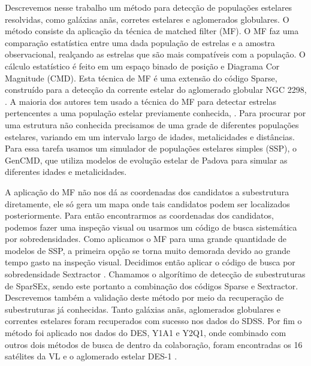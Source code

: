 \documentclass[
	12pt,				%
	openany,			%
	oneside,			%
	a4paper,			%
	english,			%
	brazil				%
	]{abntex2}
\begin{document}
Descrevemos nesse trabalho um método para detecção de populações estelares resolvidas, como galáxias anãs, corretes estelares e aglomerados globulares. O método consiste da aplicação da técnica de matched filter (MF). O MF faz uma comparação estatística entre uma dada população de estrelas e a amostra observacional,  realçando as estrelas que são mais compatíveis com a população. O cálculo estatístico é feito em um espaço binado de posição e Diagrama Cor Magnitude (CMD). Esta técnica de MF é uma extensão do código Sparse, construído para a detecção da corrente estelar do aglomerado globular NGC 2298, \cite{2011MNRAS.416..393B}.
A maioria dos autores tem usado a técnica do MF para detectar estrelas pertencentes a uma população estelar previamente conhecida, \cite{2012ASPC..458..219G,2009AAS...21344217D}. Para procurar por uma estrutura não conhecida precisamos de uma grade de diferentes populações estelares, variando em um intervalo largo de idades, metalicidades e distâncias. Para essa tarefa usamos um simulador de populações estelares simples (SSP), o GenCMD, que utiliza modelos de evolução estelar de Padova \cite{2012MNRAS.427..127B} para simular as diferentes idades e metalicidades. \par

A aplicação do MF não nos dá as coordenadas dos candidatos a subestrutura diretamente, ele só gera um mapa onde tais candidatos podem ser localizados posteriormente. Para então encontrarmos as coordenadas dos candidatos, podemos fazer uma inspeção visual  ou usarmos um código de busca sistemática por sobredensidades. Como aplicamos o MF para uma grande quantidade de modelos de SSP,  a primeira opção se torna muito demorada devido ao grande tempo gasto na inspeção visual. Decidimos então aplicar o código de busca por sobredensidade Sextractor  \cite{1996A&AS..117..393B}.
	Chamamos o algorítimo de detecção de subestruturas de SparSEx, sendo este portanto a combinação dos códigos Sparse e Sextractor. Descrevemos também  a validação deste método por meio da recuperação de subestruturas já conhecidas. Tanto galáxias anãs, aglomerados globulares e correntes estelares foram recuperados com sucesso nos dados do SDSS. Por fim o método foi aplicado nos dados do DES, Y1A1 e Y2Q1,  onde combinado com outros dois métodos de busca de  dentro da colaboração,  foram encontradas os 16 satélites da VL e o aglomerado estelar DES-1 \cite{2015ApJ...807...50B,2015arXiv150803622T,2015arXiv150802381L}.   


\end{document}
